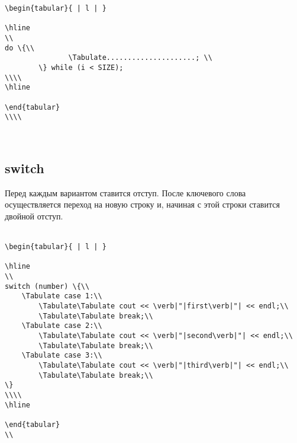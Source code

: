 \documentclass{article}
\begin{document}
\begin{left}
\begin{lstlisting}
\begin{tabular}{ | l | }

\hline
\\
do \{\\
               \Tabulate.....................; \\
        \} while (i < SIZE);
\\\\
\hline

\end{tabular}
\\\\
\end{lstlisting}
\end{left}\
\newpage
\subsection{switch}
Перед каждым вариантом ставится отступ. После ключевого слова осуществляется переход на новую строку и, начиная с этой строки ставится двойной отступ.\\\\
\begin{lstlisting}
\begin{tabular}{ | l | }

\hline
\\
switch (number) \{\\
    \Tabulate case 1:\\
        \Tabulate\Tabulate cout << \verb|"|first\verb|"| << endl;\\ 
        \Tabulate\Tabulate break;\\
    \Tabulate case 2:\\
        \Tabulate\Tabulate cout << \verb|"|second\verb|"| << endl;\\ 
        \Tabulate\Tabulate break;\\
    \Tabulate case 3:\\
        \Tabulate\Tabulate cout << \verb|"|third\verb|"| << endl;\\ 
        \Tabulate\Tabulate break;\\
\}
\\\\
\hline

\end{tabular}
\\
\end{lstlisting}
\end{document}
